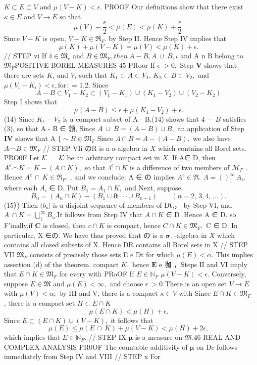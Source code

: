 $K\subset E\subset V$ and $\mu(V-K)<\epsilon.$ PROOF Our definitions show that there exist $\scriptstyle{\kappa\in E}$ and $V\to E$ so that $$ \mu(V)-{\frac{\epsilon}{2}}<\mu(E)<\mu(K)+{\frac{\epsilon}{2}}. $$ Since $V-K$ is open, $V-K\in\Re_{F}.$ by Step II. Hence Step IV implies that $$ \mu(K)+\mu(V-K)=\mu(V)<\mu(K)+\epsilon. $$ // STEP vi If $4\in\mathfrak{M}_{r}$ and $B\in\mathfrak{M}_{F},t h e n~A-B,A\ \cup~B,\iota$ and A n B belong to ${\mathfrak{M}}_{F}$POSITIVE BOREL MEASURES $45$ PRoor If $\scriptstyle\epsilon\;>0,$ Step $\mathbf{V}$ shows that there are sets $K_{i}$ and ${\mathit{V}}_{i}$ such that $K_{1}\subset A\subset V_{1},\,K_{2}\subset B\subset V_{2},$ and $\mu(V_{i}-K_{i})<\epsilon,\mathrm{for}:$ = 1,2. Since $$ A-B\subset V_{1}-K_{2}\subset(V_{1}-K_{1})\cup(K_{1}-V_{2})\cup(V_{2}-K_{2}) $$ Step I shows that $$ \mu(A-B)\leq\epsilon+\mu(K_{1}-V_{2})+\epsilon. $$ (14) Since $K_{1}-V_{2}$ is a compact subset of A - B,(14) shows that $\scriptstyle4\,-\,B$ satisfies (3), so that A - B ∈ 领, Since $A\ \cup\ B=(A-B)\cup B,$ an application of Step $\mathbf{I}\mathbf{V}$ shows that A $\{\sim B\in{\mathfrak{M}}_{F}$ Since $A\cap B=A-(A-B),$ we also have $A\frown B\in{\mathfrak{M}}_{F}$ // STEP VIi のR is a o-algebra in $X$ which contains all Borel sets. PRO0F Let ${\cal K}\,\,\,\,\,\,\,\,\,\,{\cal K}$ be an arbitrary compact set in $X.$ If A∈ D, then $A^{c}\frown K=K-(A\cap K),$ so that $4^{c}\cap K$ is a difference of two members of ${\mathcal{M}}_{F}$ . Hence $A^{c}\,\cap\,K\in\Re_{F}.$ , and we conclude: A ∈ の implies $A^{c}\in\Re.$ $A=\left(\right)_{1}^{\infty}\,A_{i},$ where each $A_{i}$ ∈ D. Put $B_{1}=A_{1}\cap K,$ and Next, suppose $$ B_{n}=(A_{n}\cap K)-(B_{1}\cup\mathbf{\partial}\cdot\cdot\cdot\cup\ B_{n-1})\qquad(n=2,\,3,4,\,...). $$ (15）) Then $\scriptstyle(b_{a}|$ is a disjoint sequence of members of Dt,， by Step VI, and $A\ \cap K=\bigcup_{1}^{\infty}B_{n}.{\mathrm{It}}$ follows from Step IV that $A\cap K$ ∈ D .Hence A ∈ D. so F'inally,if ${\boldsymbol{C}}$ is closed, then $c\cap K$ is compact, hence $C\cap K\in\mathfrak{M}_{F},$ C ∈ D. In particular, X ∈の. We have thus proved that の is a ${\boldsymbol{\sigma}}.$ -algebra in $X$ which contains all closed subsets of X. Hence DR contains all Borel sets in X // STEP VII ${\mathfrak{M}}_{F}$ consists of precisely those sets E e Dt for which $\mu(E)<\alpha.$ This implies assertion (d) of the theorem. compact $K,$ hence $\boldsymbol{E}$ e 咖 ，Steps II and VI imply that $E\cap K\in{\mathfrak{M}}_{F}$ for every with PRoOF If $E\in\mathbb{N}_{F}$ $\mu(V-K)<\epsilon.$ Conversely, suppose $\scriptstyle E\in{\mathfrak{M}}$ and $\mu(E)<\infty,$ and choose $\scriptstyle\epsilon\;>0$ There is an open set $V\to E$ with $\mu(V)<\alpha;$ by III and V, there is a compact $\kappa\in V$ with Since $E\cap K\in{\mathfrak{M}}_{F}$ , there is a compact set $H\subset E\cap K$ $$ \mu(E\cap K)<\mu(H)+\epsilon. $$ Since $E\subset(E\cap K)\cup(V-K),$ it follows that $$ \mu(E)\leq\mu(E\,\cap\,K)+\mu(V-K)<\mu(H)+2\epsilon, $$ which implies that $E\in\mathbb{N}_{F}.$ // STEP IX ${\boldsymbol{\mu}}$ is a measure on ${\mathfrak{M}}.$46 REAL AND COMPLEX ANALYSIS PR0OF The countable additivity of ${\boldsymbol{\mu}}$ on De follows immediately from Step IV and VIII // STEP x For 